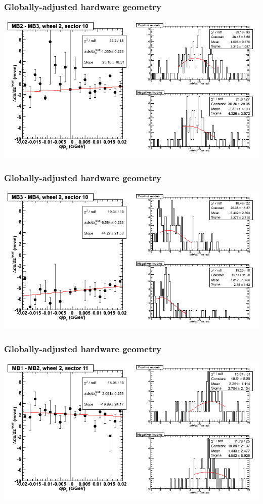\documentclass[compress]{beamer}
\begin{document}
\begin{frame}
\frametitle{Globally-adjusted hardware geometry}
\includegraphics[width=\linewidth]{NOV4_segdiffs_HW/dt13_slope_E_10_23.png}
\end{frame}

\begin{frame}
\frametitle{Globally-adjusted hardware geometry}
\includegraphics[width=\linewidth]{NOV4_segdiffs_HW/dt13_slope_E_10_34.png}
\end{frame}

\begin{frame}
\frametitle{Globally-adjusted hardware geometry}
\includegraphics[width=\linewidth]{NOV4_segdiffs_HW/dt13_slope_E_11_12.png}
\end{frame}
\end{document}
